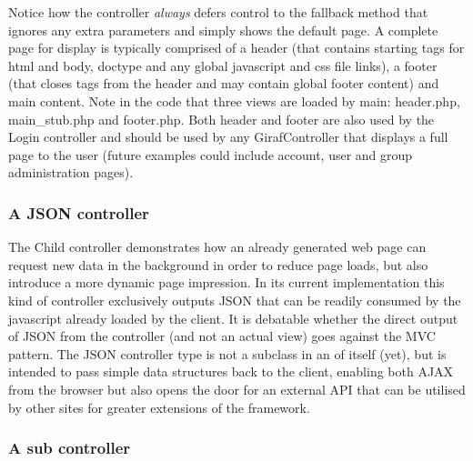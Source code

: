 

Notice how the controller \emph{always} defers control to the fallback method that ignores any extra parameters and simply shows the default page. A complete page for display is typically comprised of a header (that contains starting tags for html and body, doctype and any global javascript and css file links), a footer (that closes tags from the header and may contain global footer content) and main content. Note in the code that three views are loaded by main: header.php, main\_stub.php and footer.php. Both header and footer are also used by the Login controller and should be used by any GirafController that displays a full page to the user (future examples could include account, user and group administration pages).

\subsubsection*{A JSON controller}


The Child controller demonstrates how an already generated web page can request new data in the background in order to reduce page loads, but also introduce a more dynamic page impression. In its current implementation this kind of controller exclusively outputs JSON that can be readily consumed by the javascript already loaded by the client. It is debatable whether the direct output of JSON from the controller (and not an actual view) goes against the MVC pattern.
The JSON controller type is not a subclass in an of itself (yet), but is intended to pass simple data structures back to the client, enabling both AJAX from the browser but also opens the door for an external API that can be utilised by other sites for greater extensions of the framework.

\subsubsection*{A sub controller}
\label{controller_sub}


